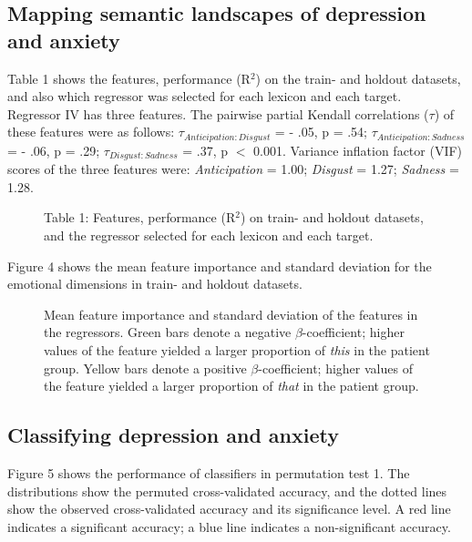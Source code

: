 \documentclass[11pt, a4paper]{article}
\begin{document}
\newpage

\subsection{Mapping semantic landscapes of depression and anxiety}

Table 1 shows the features, performance (R$^2$) on the train- and holdout datasets, and also which regressor was selected for each lexicon and each target.\\
Regressor IV has three features. The pairwise partial Kendall correlations ($\tau$) of these features were as follows: $\tau_{Anticipation:Disgust}$ = - .05, p = .54; $\tau_{Anticipation:Sadness}$ = - .06, p = .29; $\tau_{Disgust:Sadness}$ = .37, p $<$ 0.001. Variance inflation factor (VIF) scores of the three features were: \textit{Anticipation} = 1.00; \textit{Disgust} = 1.27; \textit{Sadness} = 1.28. 

\begin{figure}[hbt!]
\centering

\caption*{Table 1:  Features, performance (R$^2$) on train- and holdout datasets, and the regressor selected for each lexicon and each target.}
\end{figure}

Figure 4 shows the mean feature importance and standard deviation for the emotional dimensions in train- and holdout datasets. 

\begin{figure}[hbt!]
\centering

\caption{\label{fig:data} Mean feature importance and standard deviation of the features in the regressors. Green bars denote a negative $\beta$-coefficient; higher values of the feature yielded a larger proportion of \textit{this} in the patient group. Yellow bars denote a positive $\beta$-coefficient; higher values of the feature yielded a larger proportion of \textit{that} in the patient group.}
\end{figure}

\newpage
\subsection{Classifying depression and anxiety}

Figure 5 shows the performance of classifiers in permutation test 1. The distributions show the permuted cross-validated accuracy, and the dotted lines show the observed cross-validated accuracy and its significance level. A red line indicates a significant accuracy; a blue line indicates a non-significant accuracy.
\end{document}
